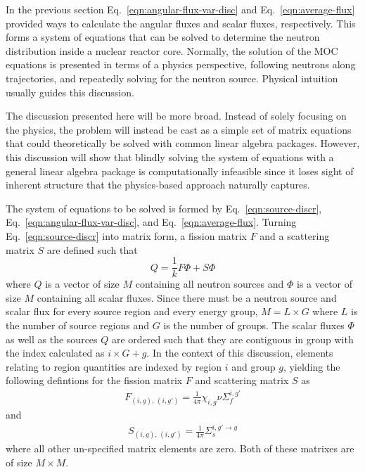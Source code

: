 In the previous section Eq.~\ref{eqn:angular-flux-var-disc} and Eq.~\ref{eqn:average-flux} provided ways to calculate the angular fluxes and scalar fluxes, respectively. This forms a system of equations that can be solved to determine the neutron distribution inside a nuclear reactor core. Normally, the solution of the MOC equations is presented in terms of a physics perspective, following neutrons along trajectories, and repeatedly solving for the neutron source. Physical intuition usually guides this discussion.

The discussion presented here will be more broad. Instead of solely focusing on the physics, the problem will instead be cast as a simple set of matrix equations that could theoretically be solved with common linear algebra packages. However, this discussion will show that blindly solving the system of equations with a general linear algebra package is computationally infeasible since it loses sight of inherent structure that the physics-based approach naturally captures.

The system of equations to be solved is formed by Eq.~\ref{eqn:source-discr}, Eq.~\ref{eqn:angular-flux-var-disc}, and Eq.~\ref{eqn:average-flux}. Turning Eq.~\ref{eqn:source-discr} into matrix form, a fission matrix $F$ and a scattering matrix $S$ are defined such that
\begin{equation}
Q = \frac{1}{k} F \Phi + S \Phi
\label{eqn:matrix-source-calc}
\end{equation}
where $Q$ is a vector of size $M$ containing all neutron sources and $\Phi$ is a vector of size $M$ containing all scalar fluxes. Since there must be a neutron source and scalar flux for every source region and every energy group, $M = L \times G$ where $L$ is the number of source regions and $G$ is the number of groups. The scalar fluxes $\Phi$ as well as the sources $Q$ are ordered such that they are contiguous in group with the index calculated as $i \times G + g$. In the context of this discussion, elements relating to region quantities are indexed by region $i$ and group $g$, yielding the following defintions for the fission matrix $F$ and scattering matrix $S$ as
\begin{eqnarray}
F_{\left(i, g\right), \, \left(i, g'\right)} = \frac{1}{4\pi} \chi_{i,g} \nu \Sigma_f^{i,g'}
\end{eqnarray}
and
\begin{eqnarray}
S_{\left(i, g\right), \, \left(i, g'\right)} = \frac{1}{4\pi} \Sigma_s^{i,g' \rightarrow g}
\end{eqnarray}
where all other un-specified matrix elements are zero. Both of these matrixes are of size $M \times M$.

